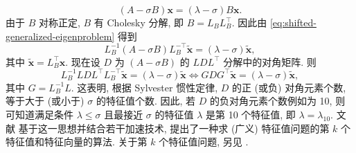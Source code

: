 \begin{equation}\label{eq:shifted-generalized-eigenproblem}(A-\sigma B)\bm x=(\lambda-\sigma)B\bm x.\end{equation}
{由于 $B$ 对称正定, $B$ 有 Cholesky 分解, 即 $B=L_BL_B^\top$. 因此由 \eqref{eq:shifted-generalized-eigenproblem} 得到}
\[
L_B^{-1}(A-\sigma B)L_B^{-\top}\tilde{\bm x}=(\lambda-\sigma)\tilde{\bm x},
\]
{其中 $\tilde{\bm x}=L_B^\top\bm x$. 现在设 $D$ 为 $(A-\sigma B)$ 的 $LDL^\top$ 分解中的对角矩阵. 则}
\[
L_B^{-1}LDL^\top L_B^{-\top}\tilde{\bm x}=(\lambda-\sigma)\tilde{\bm x}
\iff GDG^\top\tilde{\bm x}=(\lambda-\sigma)\tilde{\bm x},
\]
{其中 $G=L_B^{-1}L$. 这表明, 根据 Sylvester 惯性定律, $D$ 的正 (或负) 对角元素个数, 等于大于 (或小于) $\sigma$ 的特征值个数. 因此, 若 $D$ 的负对角元素个数例如为 10, 则可知道满足条件 $\lambda\le\sigma$ 且最接近 $\sigma$ 的特征值 $\lambda$ 是第 10 个特征值, 即 $\lambda=\lambda_{10}$. 文献  基于这一思想并结合若干加速技术, 提出了一种求 (广义) 特征值问题的第 $k$ 个特征值和特征向量的算法. 关于第 $k$ 个特征值问题, 另见 .}

